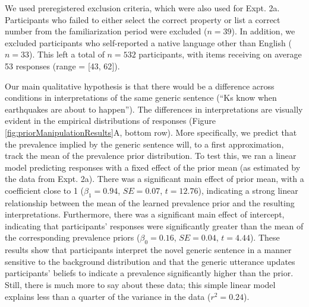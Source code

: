 \documentclass[floatsintext,doc]{apa6}
\begin{document}
We used preregistered exclusion criteria, which were also used for Expt. 2a.
Participants who failed to either select the correct property or list a correct number from the familiarization period were excluded (\(n = 39\)).
In addition, we excluded participants who self-reported a native language other than English (\(n = 33\)).
This left a total of \(n = 532\) participants, with items receiving on average 53 responses (range = {[}43, 62{]}).

Our main qualitative hypothesis is that there would be a difference across conditions in interpretations of the same generic sentence (\enquote{Ks know when earthquakes are about to happen}).
The differences in interpretations are visually evident in the empirical distributions of responses (Figure \ref{fig:priorManipulationResults}A, bottom row).
More specifically, we predict that the prevalence implied by the generic sentence will, to a first approximation, track the mean of the prevalence prior distribution.
To test this, we ran a linear model predicting responses with a fixed effect of the prior mean (as estimated by the data from Expt. 2a).
There was a significant main effect of prior mean, with a coefficient close to 1 (\(\beta_1 = 0.94\), \(SE=0.07\), \(t = 12.76\)), indicating a strong linear relationship between the mean of the learned prevalence prior and the resulting interpretations.
Furthermore, there was a significant main effect of intercept, indicating that participants' responses were significantly greater than the mean of the corresponding prevalence priors (\(\beta_0 = 0.16\), \(SE=0.04\), \(t = 4.44\)).
These results show that participants interpret the novel generic sentence in a manner sensitive to the background distribution and that the generic utterance updates participants' beliefs to indicate a prevalence significantly higher than the prior.
Still, there is much more to say about these data; this simple linear model explains less than a quarter of the variance in the data (\(r^2 = 0.24\)).
\end{document}
